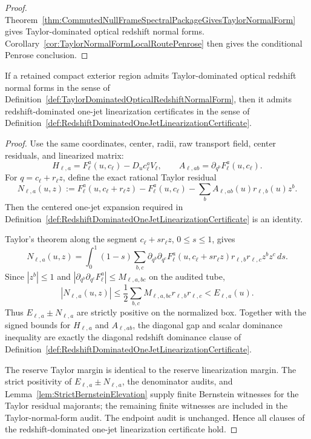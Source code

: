 \begin{proof}
Theorem~\ref{thm:CommutedNullFrameSpectralPackageGivesTaylorNormalForm} gives
Taylor-dominated optical redshift normal forms.  Corollary~\ref{cor:TaylorNormalFormLocalRoutePenrose}
then gives the conditional Penrose conclusion.
\end{proof}

\begin{theorem}\label{thm:TaylorNormalFormGivesRedshiftDominatedLinearization}
If a retained compact exterior region admits Taylor-dominated optical redshift
normal forms in the sense of
Definition~\ref{def:TaylorDominatedOpticalRedshiftNormalForm}, then it admits
redshift-dominated one-jet linearization certificates in the sense of
Definition~\ref{def:RedshiftDominatedOneJetLinearizationCertificate}.
\end{theorem}

\begin{proof}
Use the same coordinates, center, radii, raw transport field, center residuals,
and linearized matrix:
\[
    H_{\ell,a}=F_\ell^a(u,c_\ell)-D_uc_\ell^aV_\ell,
    \qquad
    A_{\ell,ab}=\partial_{q^b}F_\ell^a(u,c_\ell).
\]
For $q=c_\ell+r_\ell z$, define the exact rational Taylor residual
\[
    N_{\ell,a}(u,z)
    :=
    F_\ell^a(u,c_\ell+r_\ell z)
    -F_\ell^a(u,c_\ell)
    -
    \sum_bA_{\ell,ab}(u)r_{\ell,b}(u)z^b .
\]
Then the centered one-jet expansion required in
Definition~\ref{def:RedshiftDominatedOneJetLinearizationCertificate} is an
identity.

Taylor's theorem along the segment
$c_\ell+s r_\ell z$, $0\le s\le1$, gives
\[
    N_{\ell,a}(u,z)
    =
    \int_0^1(1-s)
    \sum_{b,c}
    \partial_{q^b}\partial_{q^c}F_\ell^a
    (u,c_\ell+s r_\ell z)
    r_{\ell,b}r_{\ell,c}z^bz^c\,ds .
\]
Since $|z^b|\le1$ and
$|\partial_{q^b}\partial_{q^c}F_\ell^a|\le M_{\ell,a,bc}$ on the audited tube,
\[
    |N_{\ell,a}(u,z)|
    \le
    \frac12\sum_{b,c}
    M_{\ell,a,bc}r_{\ell,b}r_{\ell,c}
    <
    E_{\ell,a}(u).
\]
Thus $E_{\ell,a}\pm N_{\ell,a}$ are strictly positive on the normalized box.
Together with the signed bounds for $H_{\ell,a}$ and $A_{\ell,ab}$, the
diagonal gap and scalar dominance inequality are exactly the diagonal redshift
dominance clause of
Definition~\ref{def:RedshiftDominatedOneJetLinearizationCertificate}.

The reserve Taylor margin is identical to the reserve linearization margin.
The strict positivity of $E_{\ell,a}\pm N_{\ell,a}$, the denominator audits,
and Lemma~\ref{lem:StrictBernsteinElevation} supply finite Bernstein witnesses
for the Taylor residual majorants; the remaining finite witnesses are included
in the Taylor-normal-form audit.  The endpoint audit is unchanged.  Hence all
clauses of the redshift-dominated one-jet linearization certificate hold.
\end{proof}

